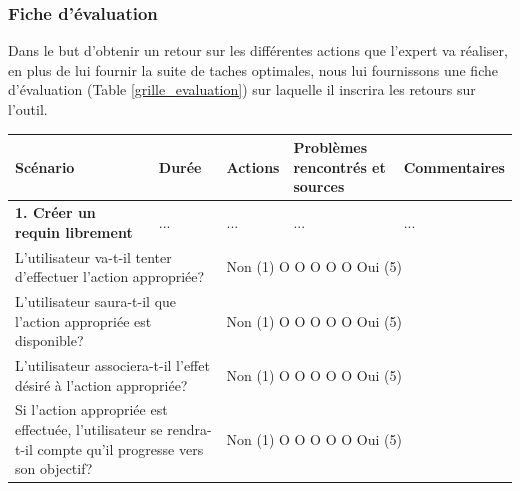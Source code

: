 \documentclass{article}
\begin{document}
\subsubsection{Fiche d'évaluation}
Dans le but d'obtenir un retour sur les différentes actions que l'expert va réaliser, en plus de lui fournir la suite de taches optimales, nous lui fournissons une fiche d'évaluation (Table \ref{grille_evaluation}) sur laquelle il inscrira les retours sur l'outil.

\newpage
\begin{table}[h]
	\centering
	\begin{tabular}{|p{6cm}|p{1.5cm}|p{1.5cm}|p{2.5cm}|p{3.5cm}|}
		\hline
		\textbf{Scénario}                                                                                                                         & \textbf{Durée}                                        & \textbf{Actions} & \textbf{Problèmes rencontrés et sources} & \textbf{Commentaires} \\ \hline
		\textbf{1. Créer un requin librement}                                                                                                     & ...                                                   & ...              & ...                                      & ...                   \\ \hline
		\multicolumn{2}{|p{7.5cm}|}{L’utilisateur va-t-il tenter d’effectuer l’action appropriée?}                                                & \multicolumn{3}{p{7.5cm}|}{Non (1) O O O O O Oui (5)}                                                                                       \\ \hline
		\multicolumn{2}{|p{7.5cm}|}{L’utilisateur saura-t-il que l’action appropriée est disponible?}                                             & \multicolumn{3}{p{7.5cm}|}{Non (1) O O O O O Oui (5)}                                                                                       \\ \hline
		\multicolumn{2}{|p{7.5cm}|}{L’utilisateur associera-t-il l’effet désiré à l’action appropriée?}                                           & \multicolumn{3}{p{7.5cm}|}{Non (1) O O O O O Oui (5)}                                                                                       \\ \hline
		\multicolumn{2}{|p{7.5cm}|}{Si l’action appropriée est effectuée, l’utilisateur se rendra-t-il compte qu’il progresse vers son objectif?} & \multicolumn{3}{p{7.5cm}|}{Non (1) O O O O O Oui (5)}                                                                                       \\ \hline

\end{tabular}
\end{table}
\end{document}
